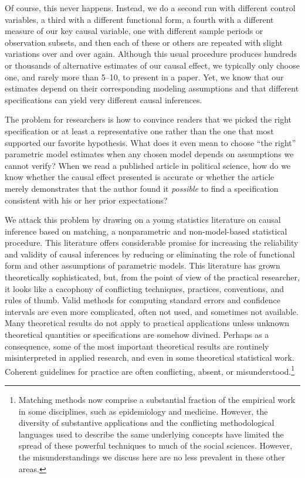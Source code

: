 \documentclass[11pt,titlepage]{article}
\begin{document}
Of course, this never happens.  Instead, we do a second run with
different control variables, a third with a different functional form,
a fourth with a different measure of our key causal variable, one with
different sample periods or observation subsets, and then each of
these or others are repeated with slight variations over and over
again.  Although this usual procedure produces hundreds or thousands
of alternative estimates of our causal effect, we typically only
choose one, and rarely more than 5--10, to present in a paper.  Yet,
we know that our estimates depend on their corresponding modeling
assumptions and that different specifications can yield very different
causal inferences.

The problem for researchers is how to convince readers that we picked
the right specification or at least a representative one rather than
the one that most supported our favorite hypothesis.  What does it
even mean to choose ``the right'' parametric model estimates when any
chosen model depends on assumptions we cannot verify?  When we read a
published article in political science, how do we know whether the
causal effect presented is accurate or whether the article merely
demonstrates that the author found it \emph{possible} to find a
specification consistent with his or her prior expectations?

We attack this problem by drawing on a young statistics literature on
causal inference based on matching, a nonparametric and
non-model-based statistical procedure.  This literature offers
considerable promise for increasing the reliability and validity of
causal inferences by reducing or eliminating the role of functional
form and other assumptions of parametric models.  This literature has
grown theoretically sophisticated, but, from the point of view of the
practical researcher, it looks like a cacophony of conflicting
techniques, practices, conventions, and rules of thumb.  Valid methods
for computing standard errors and confidence intervals are even more
complicated, often not used, and sometimes not available.  Many
theoretical results do not apply to practical applications unless
unknown theoretical quantities or specifications are somehow divined.
Perhaps as a consequence, some of the most important theoretical
results are routinely misinterpreted in applied research, and even in
some theoretical statistical work.  Coherent guidelines for practice
are often conflicting, absent, or misunderstood.\footnote{Matching
  methods now comprise a substantial fraction of the empirical work in
  some disciplines, such as epidemiology and medicine.  However, the
  diversity of substantive applications and the conflicting
  methodological languages used to describe the same underlying
  concepts have limited the spread of these powerful techniques to
  much of the social sciences.  However, the misunderstandings we
  discuss here are no less prevalent in these other areas.}
\end{document}
